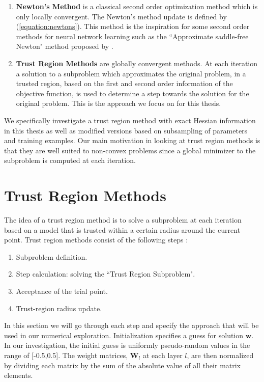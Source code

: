 \documentclass[letterpaper,12pt,titlepage,oneside,final]{book}
\begin{document}
	\begin{enumerate}
		\item{\textbf{Newton's Method} is a classical second order optimization method which is only locally convergent. The Newton's method update is defined by (\ref{equation:newtons}). This method is the inspiration for some  second order methods for neural network learning such as the ``Approximate saddle-free Newton" method proposed by \cite{saddle_free}.}
		\item{\textbf{Trust Region Methods} are globally convergent methods. At each iteration a solution to a subproblem which approximates the original problem, in a trusted region, based on the first and second order information of the objective function, is used to determine a step towards the solution for the original problem. This is the approach we focus on for this thesis. }
	\end{enumerate}
	We specifically investigate a trust region method with exact Hessian information in this thesis as well as modified versions based on subsampling of parameters and training examples. Our main motivation in looking at trust region methods is that they are well suited to non-convex problems since a global minimizer to the subproblem is computed at each iteration.
	
	\section{Trust Region Methods}
	The idea of a trust region method is to solve a subproblem at each iteration based on a model that is trusted within a certain radius around the current point. Trust region methods consist of the following steps \cite{TRM.book}:
	\begin{enumerate}
		\item {Subproblem definition.} \label{model def}
		\item {Step calculation: solving the ``Trust Region Subproblem".} \label{step calc}
		\item {Acceptance of the trial point.} \label{accept step}
		\item {Trust-region radius update.} \label{update radius}
	\end{enumerate}
	In this section we will go through each step and specify the approach that will be used in our numerical exploration. Initialization specifies a guess for solution $\mathbf{w}$. In our investigation, the initial guess is uniformly pseudo-random values in the range of [-0.5,0.5]. The weight matrices, $\mathbf{W}_{l}$ at each layer $l$, are then normalized by dividing each matrix by the sum of the absolute value of all their matrix elements. 
	
\end{document}
